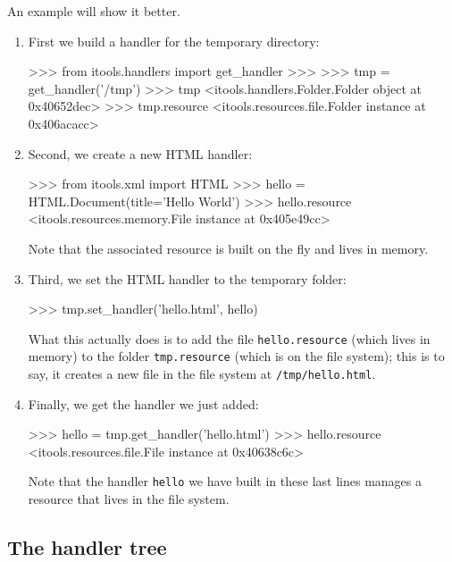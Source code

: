 An example will show it better.

\begin{enumerate}
  \item First we build a handler for the temporary directory:

\begin{code}
    >>> from itools.handlers import get_handler
    >>>
    >>> tmp = get_handler('/tmp')
    >>> tmp
    <itools.handlers.Folder.Folder object at 0x40652dec>
    >>> tmp.resource
    <itools.resources.file.Folder instance at 0x406acacc>
\end{code}

  \item Second, we create a new HTML handler:

\begin{code}
    >>> from itools.xml import HTML
    >>> hello = HTML.Document(title='Hello World')
    >>> hello.resource
    <itools.resources.memory.File instance at 0x405e49cc>
\end{code}

    Note that the associated resource is built on the fly and lives in memory.

  \item Third, we set the HTML handler to the temporary folder:

\begin{code}
    >>> tmp.set_handler('hello.html', hello)
\end{code}

    What this actually does is to add the file {\tt hello.resource} (which
    lives in memory) to the folder {\tt tmp.resource} (which is on the
    file system); this is to say, it creates a new file in the file system
    at {\tt /tmp/hello.html}.

  \item Finally, we get the handler we just added:

\begin{code}
    >>> hello = tmp.get_handler('hello.html')
    >>> hello.resource
    <itools.resources.file.File instance at 0x40638c6c>
\end{code}

    Note that the handler {\tt hello} we have built in these last lines
    manages a resource that lives in the file system.

\end{enumerate}



\subsection{The handler tree}

